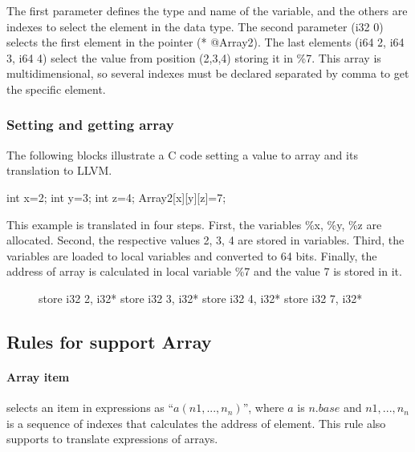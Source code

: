 \documentclass[10pt,a4paper]{article}
\begin{document}
The first parameter defines the type and name of the variable, and the others are
indexes to select the element in the data type. The second parameter (i32 0)
selects the first element in the pointer (* @Array2). The last elements 
(i64 2, i64 3, i64 4) select the value from position (2,3,4) storing it in \%7.
This array is multidimensional, so several indexes must be declared separated
by comma to get the specific element.

\subsubsection{Setting and getting array}

The following blocks illustrate a C code setting a value to array
and its translation to LLVM. 

\begin{ccode} 
int x=2; int y=3; int z=4;
Array2[x][y][z]=7;
\end{ccode}

This example is translated in four steps. First, the variables \%x, \%y, \%z 
are allocated. Second, the respective values 2, 3, 4 are stored in variables. 
Third, the variables are loaded to local variables and converted to 64 bits. 
Finally, the address of array is calculated in local variable \%7 and the value 
7 is stored in it.  
\begin{figure}[h]
\begin{llvmcode}
store i32 2, i32* %
store i32 3, i32* %
store i32 4, i32* %
store i32 7, i32* %
\end{llvmcode}
\end{figure}

\subsection{Rules for support Array}


\paragraph{Array item} selects an item in expressions as ``$a(n1,...,n_{n})$'', 
where $a$ is $n.base$ and $n1,...,n_{n}$ is a sequence of indexes that 
calculates the address of element. This rule also supports to translate 
expressions of arrays.
\end{document}
